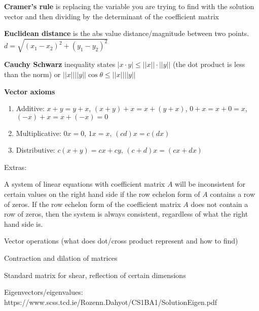 \documentclass[11pt, letterpaper, twoside]{article}
\begin{document}
\vspace{2mm}
\textbf{Cramer's rule} is replacing the variable you are trying to find with the solution vector and then dividing by the determinant of the coefficient matrix

\vspace{2mm}
\textbf{Euclidean distance} is the abs value distance/magnitude between two points. \(d=\sqrt{(x_1-x_2)^2+(y_1-y_2)^2}\)

\vspace{2mm}
\textbf{Cauchy Schwarz} inequality states \(|x\cdot y|\leq ||x||\cdot||y||\) (the dot product is less than the norm) or \(||x||||y||\cos\theta\leq||x||||y||\)

\vspace{2mm}
\textbf{Vector axioms}
\begin{enumerate}[label=-]
\item Additive: \(x+y=y+x\), \((x+y)+x=x+(y+x)\), \(0+x=x+0=x\), \((-x)+x=x+(-x)=0\)
\item Multiplicative: \(0x=0\), \(1x=x\), \((cd)x=c(dx)\)
\item Distributive: \(c(x+y)=cx+cy\), \((c+d)x=(cx+dx)\)
\end{enumerate}
\vspace{2mm}
Extras:

\vspace{2mm}
A system of linear equations with coefficient matrix \(A\) will be inconsistent for certain values on the right hand side if the row echelon form of \(A\) contains a row of zeros. If the row echelon form of the coefficient matrix \(A\) does not contain a row of zeros, then the system is always consistent, regardless of what the right hand side is.

Vector operations (what does dot/cross product represent and how to find)

Contraction and dilation of matrices

Standard matrix for shear, reflection of certain dimensions

Eigenvectors/eigenvalues:
https://www.scss.tcd.ie/Rozenn.Dahyot/CS1BA1/SolutionEigen.pdf
\end{document}
